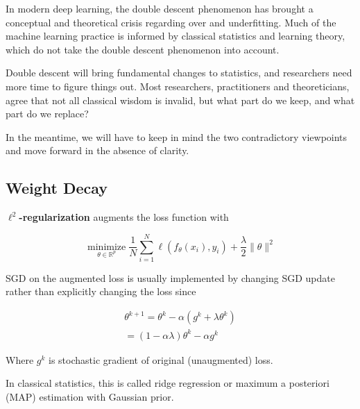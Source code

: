 \documentclass{report}
\begin{document}
\begin{concept}
    In modern deep learning, the double descent phenomenon has brought a conceptual and theoretical crisis regarding over and underfitting. Much of the machine learning practice is informed by classical statistics and learning theory, which do not take the double descent phenomenon into account.

    Double descent will bring fundamental changes to statistics, and researchers need more time to figure things out. Most researchers, practitioners and theoreticians, agree that not all classical wisdom is invalid, but what part do we keep, and what part do we replace?

    In the meantime, we will have to keep in mind the two contradictory viewpoints and move forward in the absence of clarity.
\end{concept}

\subsection{Weight Decay}

\begin{definition}
    \textbf{$\ell^{2}$-regularization} augments the loss function with

    $$
    \underset{\theta \in \mathbb{R}^{p}}{\operatorname{minimize}} \frac{1}{N} \sum_{i=1}^{N} \ell\left(f_{\theta}\left(x_{i}\right), y_{i}\right)+\frac{\lambda}{2}\|\theta\|^{2}
    $$

    SGD on the augmented loss is usually implemented by changing SGD update rather than explicitly changing the loss since

    $$
    \begin{gathered}
    \theta^{k+1}=\theta^{k}-\alpha\left(g^{k}+\lambda \theta^{k}\right) \\
    =(1-\alpha \lambda) \theta^{k}-\alpha g^{k}
    \end{gathered}
    $$

    Where $g^{k}$ is stochastic gradient of original (unaugmented) loss.

    In classical statistics, this is called ridge regression or maximum a posteriori (MAP) estimation with Gaussian prior.
\end{definition}
\end{document}
